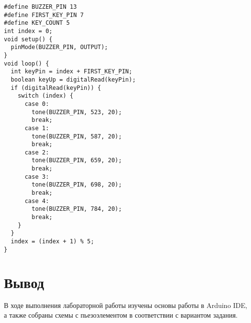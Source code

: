 \documentclass[a4paper,14pt]{extarticle}
\begin{document}
  \noindent
  \begin{Verbatim}[tabsize=2,fontsize=\small]
#define BUZZER_PIN 13
#define FIRST_KEY_PIN 7
#define KEY_COUNT 5
int index = 0;
void setup() {
  pinMode(BUZZER_PIN, OUTPUT);
}
void loop() {
  int keyPin = index + FIRST_KEY_PIN;
  boolean keyUp = digitalRead(keyPin);
  if (digitalRead(keyPin)) {
    switch (index) {
      case 0:
        tone(BUZZER_PIN, 523, 20);
        break;
      case 1:
        tone(BUZZER_PIN, 587, 20);
        break;
      case 2:
        tone(BUZZER_PIN, 659, 20);
        break;
      case 3:
        tone(BUZZER_PIN, 698, 20);
        break;
      case 4:
        tone(BUZZER_PIN, 784, 20);
        break;
    }
  }
  index = (index + 1) % 5;
}
  \end{Verbatim}

  \section*{\hspace{12.5mm}Вывод}
  В ходе выполнения лабораторной работы изучены основы работы в Arduino IDE, а также собраны схемы с пьезоэлементом в соответствии с вариантом задания.
\end{document}
